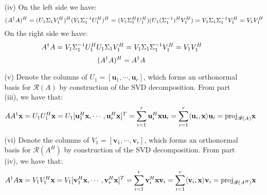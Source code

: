 \documentclass[letterpaper,12pt]{article}
\theoremstyle{definition}
\begin{document}
\begin{enumerate}
\begin{enumerate}
\begin{equation*}
        \end{equation*}
      \item[(iv)]
      On the left side we have:
       \begin{equation*}
         (A^\text{\textdagger}A)^H = (U_1\Sigma_1V_1^H)^H(V_1\Sigma_1^{-1}U_1^H)^H=(V_1\Sigma_1^HU_1^H)(U_1(\Sigma_1^{-1})^HV_1^H) = V_1\Sigma_1\Sigma_1^{-1}V_1^H=V_1V_1^H
       \end{equation*}
      On the right side we have:
      \begin{equation*}
        A^\text{\textdagger}A = V_1\Sigma_1^{-1}U_1^HU_1\Sigma_1V_1^H = V_1\Sigma_1\Sigma_1^{-1}V_1^H=V_1V_1^H
      \end{equation*}
      \begin{equation*}
        (A^\text{\textdagger}A)^H = A^\text{\textdagger}A
      \end{equation*}
      \item[(v)]
      Denote the columns of $U_1 = [\mathbf{u}_1,\cdots,\mathbf{u}_r]$, which forms an orthonormal basis for $\mathscr{R}(A)$ by construction of the SVD decomposition. From part (iii), we have that:
        \begin{align*}
          AA^\text{\textdagger}\mathbf{x} &= U_1U_1^H\mathbf{x} =  U_1[\mathbf{u}_1^H\mathbf{x},\cdots,\mathbf{u}_r^H\mathbf{x}]^T = \sum_{i=1}^r \mathbf{u}_i^H\mathbf{x}\mathbf{u}_i = \sum_{i=1}^r \langle\mathbf{u}_i,\mathbf{x}\rangle\mathbf{u}_i = \text{proj}_{\mathscr{R}(A)}\mathbf{x}
        \end{align*}
      \item[(vi)]
      Denote the columns of $V_1 = [\mathbf{v}_1,\cdots,\mathbf{v}_r]$, which forms an orthonormal basis for $\mathscr{R}(A^H)$ by construction of the SVD decomposition. From part (iv), we have that:
        \begin{align*}
          A^\text{\textdagger}A\mathbf{x} &= V_1V_1^H\mathbf{x} =  V_1[\mathbf{v}_1^H\mathbf{x},\cdots,\mathbf{v}_r^H\mathbf{x}]^T = \sum_{i=1}^r \mathbf{v}_i^H\mathbf{x}\mathbf{v}_i = \sum_{i=1}^r \langle\mathbf{v}_i,\mathbf{x}\rangle\mathbf{v}_i = \text{proj}_{\mathscr{R}(A^H)}\mathbf{x}
        \end{align*}
    \end{enumerate}
\end{enumerate}
\end{document}
